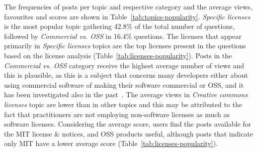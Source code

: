 \documentclass{elsarticle}
\begin{document}
The frequencies of posts per topic and respective category and the average views, favourites and scores are shown in Table~\ref{tab:topics-popularity}. \emph{Specific licenses} is the most popular topic gathering 42.8\% of the total number of questions, followed by \emph{Commercial vs. OSS} in 16.4\% questions. The licenses that appear primarily in \emph{Specific licenses} topics are the top licenses present in the questions based on the license analysis (Table~\ref{tab:licenses-popularity}). Posts in the \emph{Commercial vs. OSS} category receive the highest average number of views and this is plausible, as this is a subject that concerns many developers either about using commercial software of making their software commercial or OSS, and it has been investigated also in the past~\cite{bitzer2004commercial}. The average views in \emph{Creative commons licenses} topic are lower than in other topics and this may be attributed to the fact that practitioners are not employing non-software licenses as much as software licenses. Considering the average score, users find the posts available for the MIT license \& notices, and OSS products useful, although posts that indicate only MIT have a lower average score (Table~\ref{tab:licenses-popularity}). 
\end{document}
